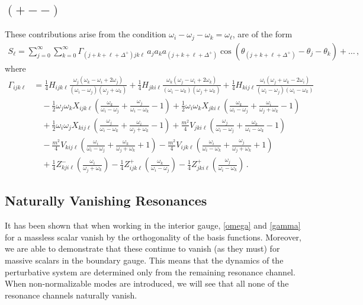 \documentclass[letterpaper,11pt]{article}
\newcommand{\oi}{\omega_i}
\newcommand{\oj}{\omega_j}
\newcommand{\ok}{\omega_k}
\newcommand{\ol}{\omega_\ell}
\newcommand{\thj}{\theta_j}
\newcommand{\thk}{\theta_k}
\begin{document}

\subsection{$(+--)$}

These contributions arise from the condition $\oi - \oj - \ok = \ol$, are of the form
\begin{align}
S_\ell = \sum_{j=0}^\infty \sum_{k=0}^\infty \Gamma_{(j + k + \ell + \Delta^+) jk\ell} \, a_j a_k a_{(j+k+\ell + \Delta^+)} \cos \left( \theta_{(j+k+\ell + \Delta^+)} - \thj - \thk \right) + \ldots \, ,
\end{align}
where
\begin{align}
\label{gamma}
\Gamma_{ijk\ell} &= \frac{1}{4} H_{ijk\ell} \frac{\oj (\ok - \oi + 2\oj)}{(\oi - \oj)(\oj + \ok)} + \frac{1}{4} H_{jki\ell} \frac{\ok (\oj - \oi + 2\ok)}{(\oi - \ok)(\oj + \ok)} + \frac{1}{4} H_{kij\ell} \frac{\oi (\oj + \ok - 2\oi)}{(\oi - \oj)(\oi - \ok)} \nonumber \\
% 
& \quad -\frac{1}{2} \oj \ok X_{ijk\ell} \left( \frac{\ok}{\oi - \oj} + \frac{\oj}{\oi - \ok} - 1\right) + \frac{1}{2} \oi \ok X_{jki\ell} \left( \frac{\ok}{\oi - \oj} + \frac{\oi}{\oj + \ok} - 1 \right) \nonumber \\
%
& \quad + \frac{1}{2} \oi \oj X_{kij\ell} \left( \frac{\oj}{\oi - \ok} + \frac{\oi}{\oj + \ok} -1 \right) + \frac{m^2}{4} V_{jki\ell} \left( \frac{\oj}{\oi - \oj} + \frac{\ok}{\oi - \ok} -1\right) \nonumber \\
%
& \quad - \frac{m^2}{4} V_{kij\ell} \left( \frac{\oi}{\oi - \oj} + \frac{\ok}{\oj + \ok} + 1\right) - \frac{m^2}{4} V_{ijk\ell} \left( \frac{\oi}{\oi - \ok} + \frac{\oj}{\oj + \ok} + 1 \right) \nonumber \\
%
& \quad + \frac{1}{4} Z^-_{kji\ell} \left( \frac{\oi}{\oj + \ok}\right) - \frac{1}{4} Z^+_{ijk\ell} \left( \frac{\ok}{\oi - \oj} \right) - \frac{1}{4} Z^+_{jki\ell} \left( \frac{\oj}{\oi - \ok}\right) \, .
\end{align}


\subsection{Naturally Vanishing Resonances}

It has been shown that when working in the interior gauge, \eqref{omega} and \eqref{gamma} for a massless scalar vanish by the orthogonality of the basis functions. Moreover, we are able to demonstrate that these continue to vanish (as they must) for massive scalars in the boundary gauge. This means that the dynamics of the perturbative system are determined only from the remaining resonance channel. When non-normalizable modes are introduced, we will see that all none of the resonance channels naturally vanish.
\end{document}
